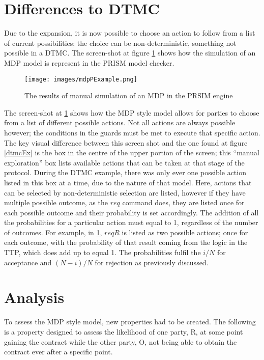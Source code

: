 \documentclass{l4proj}
\begin{document}
\section{Differences to DTMC}

Due to the expansion, it is now possible to choose an action to follow from a list of current possibilities; the choice can be non-deterministic, something not possible in a DTMC. The screen-shot at figure \ref{mdpPEx} shows how the simulation of an MDP model is represent in the PRISM model checker.

\begin{figure}[h!]
\centering
\texttt{[image: images/mdpPExample.png]}
\caption{The results of manual simulation of an MDP in the PRSIM engine}
\label{mdpPEx}
\end{figure}

The screen-shot at \ref{mdpPEx} shows how the MDP style model allows for parties to choose from a list of different possible actions. Not all actions are always possible however; the conditions in the guards must be met to execute that specific action. The key visual difference between this screen shot and the one found at figure \ref{dtmcEx} is the box in the centre of the upper portion of the screen; this ``manual exploration'' box lists available actions that can be taken at that stage of the protocol. During the DTMC example, there was only ever one possible action listed in this box at a time, due to the nature of that model. Here, actions that can be selected by non-deterministic selection are listed, however if they have multiple possible outcome, as the $req$ command does, they are listed once for each possible outcome and their probability is set accordingly. The addition of all the probabilities for a particular action must equal to 1, regardless of the number of outcomes. For example, in \ref{mdpPEx}, $reqR$ is listed as two possible actions; once for each outcome, with the probability of that result coming from the logic in the TTP, which does add up to equal 1. The probabilities fulfil the $i/N$ for acceptance and $(N-i)/N$ for rejection as previously discussed.


\section{Analysis}
 
 
To assess the MDP style model, new properties had to be created. The following is a property designed to assess the likelihood of one party, R, at some point gaining the contract while the other party, O, not being able to obtain the contract ever after a specific point.
\end{document}
